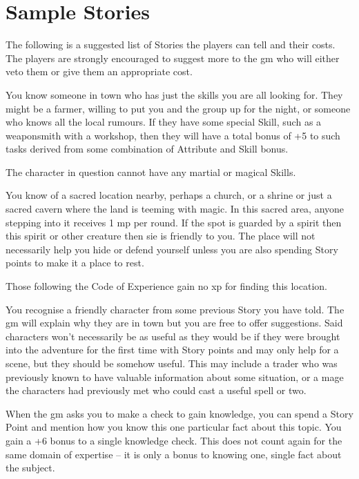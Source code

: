 \documentclass[titlepage,a4paper,openany]{book}
\begin{document}
\section{Sample Stories}

\begin{multicols}{2}

The following is a suggested list of Stories the players can tell and their costs. The players are strongly encouraged to suggest more to the \gls{gm} who will either veto them or give them an appropriate cost.

You know someone in town who has just the skills you are all looking for. They might be a farmer, willing to put you and the group up for the night, or someone who knows all the local rumours. If they have some special Skill, such as a weaponsmith with a workshop, then they will have a total bonus of +5 to such tasks derived from some combination of Attribute and Skill bonus.

The character in question cannot have any martial or magical Skills.

You know of a sacred location nearby, perhaps a church, or a shrine or just a sacred cavern where the land is teeming with magic. In this sacred area, anyone stepping into it receives 1 \gls{mp} per \gls{round}. If the spot is guarded by a spirit then this spirit or other creature then sie is friendly to you. The place will not necessarily help you hide or defend yourself unless you are also spending Story points to make it a place to rest.

Those following the Code of Experience gain no \gls{xp} for finding this location.

You recognise a friendly character from some previous Story you have told. The \gls{gm} will explain why they are in town but you are free to offer suggestions. Said characters won't necessarily be as useful as they would be if they were brought into the adventure for the first time with Story points and may only help for a scene, but they should be somehow useful. This may include a trader who was previously known to have valuable information about some situation, or a mage the characters had previously met who could cast a useful spell or two.

When the \gls{gm} asks you to make a check to gain knowledge, you can spend a Story Point and mention how you know this one particular fact about this topic. You gain a +6 bonus to a single knowledge check. This does not count again for the same domain of expertise -- it is only a bonus to knowing one, single fact about the subject.


\end{multicols}
\end{document}
